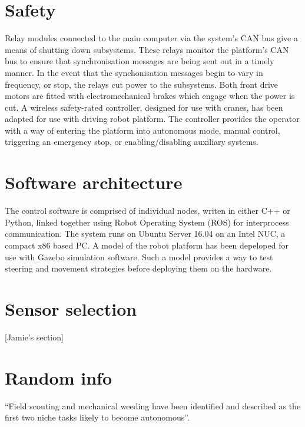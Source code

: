 \documentclass[preprint,authoryear,12pt]{elsarticle}
\begin{document}
\section{Safety}
\label{sect:safety}
    Relay modules connected to the main computer via the system's CAN bus give a means of shutting down subsystems.
    These relays monitor the platform's CAN bus to ensure that synchronisation messages are being sent out in a timely manner.
    In the event that the synchonisation messages begin to vary in frequency, or stop, the relays cut power to the subsystems.
    Both front drive motors are fitted with electromechanical brakes which engage when the power is cut.
    A wireless safety-rated controller, designed for use with cranes, has been adapted for use with driving robot platform.
    The controller provides the operator with a way of entering the platform into autonomous mode, manual control, triggering an emergency stop, or enabling/disabling auxiliary systems.

\section{Software architecture}
\label{sect:software}
    The control software is comprised of individual nodes, writen in either C++ or Python, linked together using Robot Operating System (ROS) for interprocess communication.
    The system runs on Ubuntu Server 16.04 on an Intel NUC, a compact x86 based PC.
    A model of the robot platform has been depeloped for use with Gazebo simulation software.
    Such a model provides a way to test steering and movement strategies before deploying them on the hardware.

\section{Sensor selection}
\label{sect:sensors}
    [Jamie's section]

\section{Random info}

``Field scouting and mechanical weeding have been identified and described as the first two niche tasks likely to become autonomous''\citep{Blackmore2004}.


\end{document}

